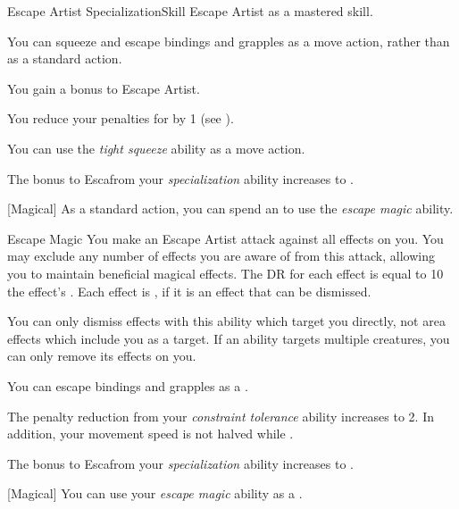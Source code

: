     \begin{feat}{Escape Artist Specialization}{Skill}
        \featpre Escape Artist as a mastered skill.

         You can squeeze and escape bindings and grapples as a move action, rather than as a standard action.

         You gain a  bonus to Escape Artist.

         You reduce your penalties for  by 1 (see ).

         You can use the \textit{tight squeeze} ability as a move action.

         The bonus to Escafrom your \textit{specialization} ability increases to .

        [Magical] As a standard action, you can spend an  to use the \textit{escape magic} ability.
        \begin{ability}{Escape Magic}
            You make an Escape Artist attack against all  effects on you.
            You may exclude any number of effects you are aware of from this attack, allowing you to maintain beneficial magical effects.
            The DR for each effect is equal to 10 \add the effect's .
            \hit Each effect is , if it is an effect that can be dismissed.
        \end{ability}

        You can only dismiss effects with this ability which target you directly, not area effects which include you as a target.
        If an ability targets multiple creatures, you can only remove its effects on you.

         You can escape bindings and grapples as a .

         The penalty reduction from your \textit{constraint tolerance} ability increases to 2.
        In addition, your movement speed is not halved while .

         The bonus to Escafrom your \textit{specialization} ability increases to .

        [Magical] You can use your \textit{escape magic} ability as a .
    \end{feat}

